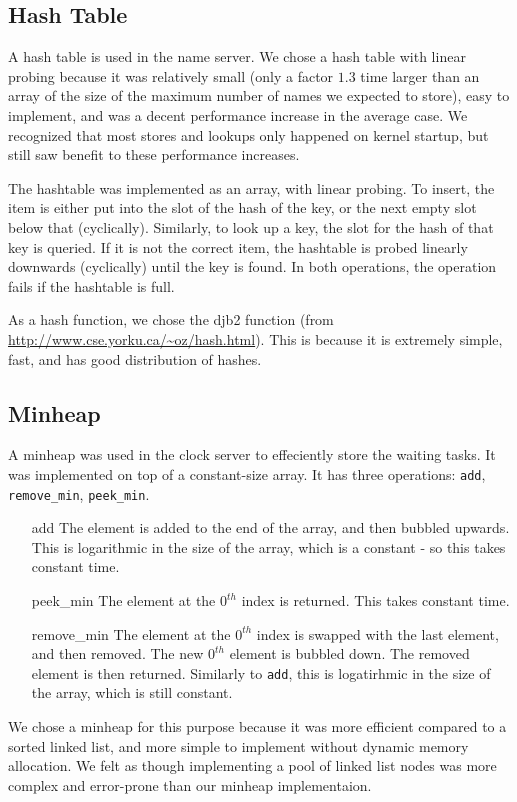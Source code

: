 \documentclass{article}
\begin{document}
\subsection{Hash Table}
A hash table is used in the name server. We chose a hash table with linear probing because it was relatively small (only a factor $1.3$ time larger than an array of the size of the maximum number of names we expected to store), easy to implement, and was a decent performance increase in the average case. We recognized that most stores and lookups only happened on kernel startup, but still saw benefit to these performance increases.

The hashtable was implemented as an array, with linear probing. To insert, the item is either put into the slot of the hash of the key, or the next empty slot below that (cyclically).
Similarly, to look up a key, the slot for the hash of that key is queried.
If it is not the correct item, the hashtable is probed linearly downwards (cyclically) until the key is found.
In both operations, the operation fails if the hashtable is full.

As a hash function, we chose the djb2 function (from \url{http://www.cse.yorku.ca/\~oz/hash.html}). This is because it is extremely simple, fast, and has good distribution of hashes.
\subsection{Minheap}
    A minheap was used in the clock server to effeciently store the waiting tasks. It was implemented on top of a constant-size array. It has three operations: \verb|add|, \verb|remove_min|, \verb|peek_min|.
\begin{enumerate}
    \item[add] The element is added to the end of the array, and then bubbled upwards. This is logarithmic in the size of the array, which is a constant - so this takes constant time.
    \item[peek\_min] The element at the $0^{th}$ index is returned. This takes constant time.
    \item[remove\_min] The element at the $0^{th}$ index is swapped with the last element, and then removed. The new $0^{th}$ element is bubbled down. The removed element is then returned.
    Similarly to \verb|add|, this is logatirhmic in the size of the array, which is still constant.
\end{enumerate}
    We chose a minheap for this purpose because it was more efficient compared to a sorted linked list, and more simple to implement without dynamic memory allocation. We felt as though implementing a pool of linked list nodes was more complex and error-prone than our minheap implementaion.
\end{document}
